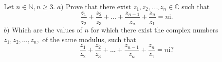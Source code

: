 Let $n \in \mathbb{N}, n \ge 3.$
$a)$ Prove that there exist $z_1,z_2,…,z_n \in \mathbb{C}$ such that $$\frac{z_1}{z_2}+ \frac{z_2}{z_3}+…+ \frac{z_{n-1}}{z_n}+ \frac{z_n}{z_1}=n \mathrm{i}.$$$b)$ Which are the values of $n$ for which there exist the complex numbers $z_1,z_2,…,z_n,$ of the same modulus, such that $$\frac{z_1}{z_2}+ \frac{z_2}{z_3}+…+ \frac{z_{n-1}}{z_n}+ \frac{z_n}{z_1}=n \mathrm{i}?$$